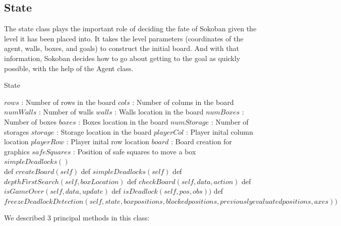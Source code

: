 \documentclass{article}
\begin{document}
\subsection{State}
The state class plays the important role of deciding the fate of Sokoban given the level it has been placed into. It takes the level parameters (coordinates of the agent, walls, boxes, and goals) to construct the initial board. And with that information, Sokoban decides how to go about getting to the goal as quickly possible, with the help of the Agent class. 

\begin{algorithm}
\caption{State}
\begin{algorithmic}
  \State $rows$ : Number of rows in the board
  \State $cols$ : Number of colums in the board
  \State $numWalls$ : Number of walls
  \State $walls$ : Walls location in the board
  \State $numBoxes$ : Number of boxes
  \State $boxes$ : Boxes location in the board
  \State $numStorage$ : Number of storages
  \State $storage$ : Storage location in the board
  \State $playerCol$ : Player inital column location 
  \State $playerRow$ : Player inital row location
  \State $board$ : Board creation for graphics
  \State $safeSquares$ : Position of safe squares to move a box
  \State $simpleDeadlocks()$ \\
  
  \State def $createBoard(self)$
  \State def $simpleDeadlocks(self)$
  \State def $depthFirstSearch(self, boxLocation)$
  \State def $checkBoard(self, data, action)$
  \State def $isGameOver(self, data, update)$
  \State def $isDeadlock(self, pos, obs))$
  \State def $freezeDeadlockDetection(self, state, box positions, blocked positions, previously evaluated positions, axes))$
\EndStruct
\end{algorithmic}
\label{Class}
\end{algorithm}

We described 3 principal methods in this class:
    
\end{document}
